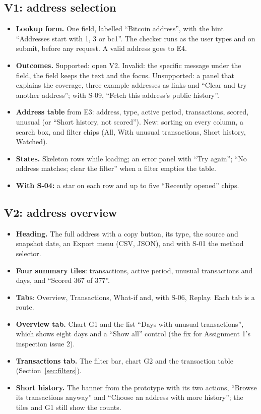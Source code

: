 \subsection{V1: address selection}

\begin{itemize}
  \item \textbf{Lookup form.} One field, labelled ``Bitcoin address'', with the hint ``Addresses
    start with 1, 3 or bc1''. The checker runs as the user types and on submit, before any request.
    A valid address goes to E4.
  \item \textbf{Outcomes.} Supported: open V2. Invalid: the specific message under the field, the
    field keeps the text and the focus. Unsupported: a panel that explains the coverage, three
    example addresses as links and ``Clear and try another address''; with S-09, ``Fetch this
    address's public history''.
  \item \textbf{Address table} from E3: address, type, active period, transactions, scored,
    unusual (or ``Short history, not scored''). New: sorting on every column, a search box, and
    filter chips (All, With unusual transactions, Short history, Watched).
  \item \textbf{States.} Skeleton rows while loading; an error panel with ``Try again''; ``No
    address matches; clear the filter'' when a filter empties the table.
  \item \textbf{With S-04:} a star on each row and up to five ``Recently opened'' chips.
\end{itemize}

\subsection{V2: address overview}

\begin{itemize}
  \item \textbf{Heading.} The full address with a copy button, its type, the source and snapshot
    date, an Export menu (CSV, JSON), and with S-01 the method selector.
  \item \textbf{Four summary tiles}: transactions, active period, unusual transactions and days,
    and ``Scored 367 of 377''.
  \item \textbf{Tabs}: Overview, Transactions, What-if and, with S-06, Replay. Each tab is a route.
  \item \textbf{Overview tab.} Chart G1 and the list ``Days with unusual transactions'', which
    shows eight days and a ``Show all'' control (the fix for Assignment 1's inspection issue 2).
  \item \textbf{Transactions tab.} The filter bar, chart G2 and the transaction table
    (Section~\ref{sec:filters}).
  \item \textbf{Short history.} The banner from the prototype with its two actions, ``Browse its
    transactions anyway'' and ``Choose an address with more history''; the tiles and G1 still show
    the counts.
\end{itemize}


